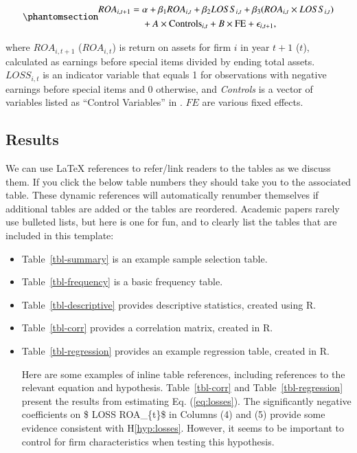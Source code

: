 \documentclass[
  authoryear,
  preprint]{elsarticle}
\begin{document}
\begin{equation}\phantomsection\label{eq-losses}{
\begin{aligned}
    ROA_{i,t+1} = {} & \alpha + \beta_1 ROA_{i,t} + \beta_2 LOSS_{i,t} + \beta_3 (ROA_{i,t} \times LOSS_{i,t}) \\
    & + A \times \text{Controls}_{i,t} + B \times \text{FE} + \epsilon_{i,t+1},
\end{aligned}
}\end{equation}

where \(ROA_{i,t+1}\) (\(ROA_{i,t}\)) is return on assets for firm \(i\)
in year \(t+1\) (\(t\)), calculated as earnings before special items
divided by ending total assets. \(LOSS_{i,t}\) is an indicator variable
that equals 1 for observations with negative earnings before special
items and 0 otherwise, and \emph{Controls} is a vector of variables
listed as ``Control Variables'' in \citep[Appendix][]{vars}. \(FE\) are
various fixed effects.

\subsection{Results}\label{results}

We can use LaTeX references to refer/link readers to the tables as we
discuss them. If you click the below table numbers they should take you
to the associated table. These dynamic references will automatically
renumber themselves if additional tables are added or the tables are
reordered. Academic papers rarely use bulleted lists, but here is one
for fun, and to clearly list the tables that are included in this
template:

\begin{itemize}
\item
  Table~\ref{tbl-summary} is an example sample selection table.
\item
  Table~\ref{tbl-frequency} is a basic frequency table.
\item
  Table~\ref{tbl-descriptive} provides descriptive statistics, created
  using R.
\item
  Table~\ref{tbl-corr} provides a correlation matrix, created in R.
\item
  Table~\ref{tbl-regression} provides an example regression table,
  created in R.

  Here are some examples of inline table references, including
  references to the relevant equation and hypothesis.
  Table~\ref{tbl-corr} and Table~\ref{tbl-regression} present the
  results from estimating Eq. (\ref{eq:losses}). The significantly
  negative coefficients on \$ LOSS \times ROA\_\{t\}\$ in Columns (4)
  and (5) provide some evidence consistent with H\ref{hyp:losses}.
  However, it seems to be important to control for firm characteristics
  when testing this hypothesis.
\end{itemize}
\end{document}
